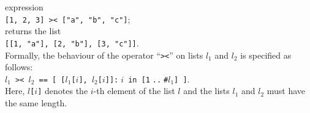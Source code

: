 \begin{enumerate}
      expression      
      \\[0.2cm]
      \hspace*{1.3cm}
      \texttt{[1, 2, 3] >< ["a", "b", "c"]};
      \\[0.2cm]
      returns the list
      \\[0.2cm]
      \hspace*{1.3cm}
      \texttt{[[1, "a"], [2, "b"], [3, "c"]]}.
      \\[0.2cm]
      Formally, the behaviour of the operator ``\texttt{><}'' on lists $l_1$ and $l_2$ is specified as follows:
      \\[0.2cm]
      \hspace*{1.3cm}
      \texttt{$l_1$ >< $l_2$ == [ [$l_1$[$i$], $l_2$[$i$]]:$\;i$ in [1$\;$..$\;$\#$l_1$] ]}.
      \\[0.2cm]
      Here, \texttt{$l$[$i$]} denotes the $i$-th element of the list $l$ and the lists $l_1$ and
      $l_2$ must have the same length.
\end{enumerate}

